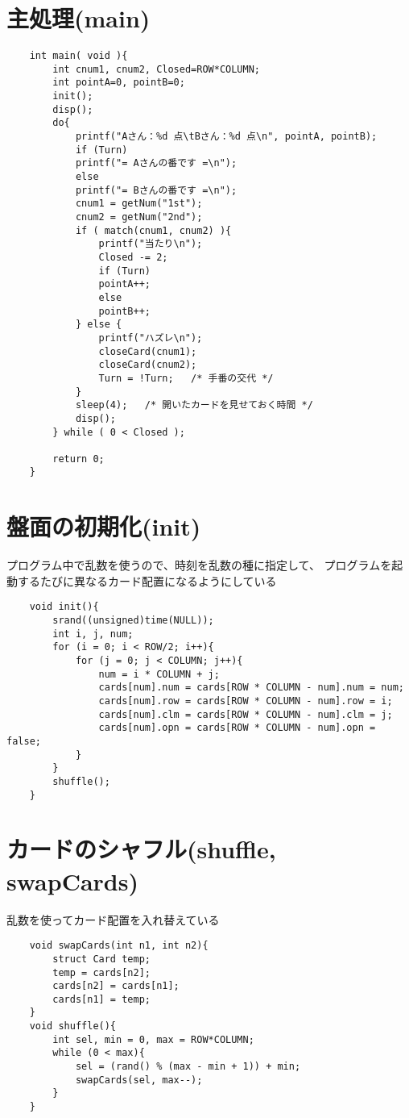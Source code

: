 \documentclass[uplatex,a4paper,11pt,oneside,openany]{jsarticle}
\begin{document}
\newpage

\section{主処理(main)}

\begin{lstlisting}
	int main( void ){
		int cnum1, cnum2, Closed=ROW*COLUMN;
		int pointA=0, pointB=0;
		init();
		disp();
		do{
			printf("Aさん：%d 点\tBさん：%d 点\n", pointA, pointB);
			if (Turn)
			printf("= Aさんの番です =\n");
			else
			printf("= Bさんの番です =\n");
			cnum1 = getNum("1st");
			cnum2 = getNum("2nd");
			if ( match(cnum1, cnum2) ){
				printf("当たり\n");
				Closed -= 2;
				if (Turn)
				pointA++;
				else
				pointB++;
			} else {
				printf("ハズレ\n");
				closeCard(cnum1);
				closeCard(cnum2);
				Turn = !Turn;   /* 手番の交代 */
			}
			sleep(4);   /* 開いたカードを見せておく時間 */
			disp();
		} while ( 0 < Closed );
		
		return 0;
	}
\end{lstlisting}

\section{盤面の初期化(init)}

プログラム中で乱数を使うので、時刻を乱数の種に指定して、
プログラムを起動するたびに異なるカード配置になるようにしている

\begin{lstlisting}
	void init(){
		srand((unsigned)time(NULL));
		int i, j, num;
		for (i = 0; i < ROW/2; i++){
			for (j = 0; j < COLUMN; j++){
				num = i * COLUMN + j;
				cards[num].num = cards[ROW * COLUMN - num].num = num;
				cards[num].row = cards[ROW * COLUMN - num].row = i;
				cards[num].clm = cards[ROW * COLUMN - num].clm = j;
				cards[num].opn = cards[ROW * COLUMN - num].opn = false;
			}
		}
		shuffle();
	}
\end{lstlisting}

\section{カードのシャフル(shuffle, swapCards)}

乱数を使ってカード配置を入れ替えている

\begin{lstlisting}
	void swapCards(int n1, int n2){
		struct Card temp;
		temp = cards[n2];
		cards[n2] = cards[n1];
		cards[n1] = temp;
	}
	void shuffle(){
		int sel, min = 0, max = ROW*COLUMN;
		while (0 < max){
			sel = (rand() % (max - min + 1)) + min;
			swapCards(sel, max--);
		}
	}
\end{lstlisting}
\end{document}

